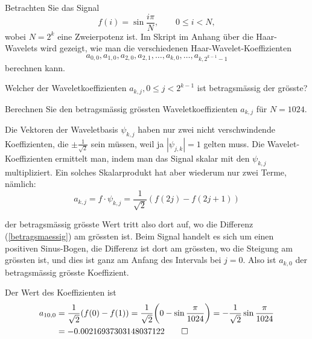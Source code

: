 Betrachten Sie das Signal
\[
f(i)=\sin\frac{i\pi}{N}, \qquad 0\le i<N,
\]
wobei $N=2^k$ eine Zweierpotenz ist.
Im Skript im Anhang über die Haar-Wavelets wird gezeigt,
wie man die verschiedenen Haar-Wavelet-Koeffizienten
\[
a_{0,0},a_{1,0}, a_{2,0},a_{2,1},\dots ,a_{k,0},\dots, a_{k,2^{k-1}-1}
\]
berechnen kann.
\begin{teilaufgaben}
\item
Welcher der Waveletkoeffizienten $a_{k,j}, 0\le j<2^{k-1}$ ist betragsmässig
der grösste?
\item
Berechnen Sie den betragsmässig grössten Waveletkoeffizienten $a_{k,j}$
für $N=1024$.
\end{teilaufgaben}


\begin{loesung}
Die Vektoren der Waveletbasis $\psi_{k,j}$ haben nur zwei nicht verschwindende
Koeffizienten, die $\pm\frac1{\sqrt{2}}$ sein müssen, weil ja $|\psi_{j,k}|=1$
gelten muss. Die Wavelet-Koeffizienten ermittelt man, indem man das Signal
skalar mit den $\psi_{k,j}$ multipliziert. Ein solches Skalarprodukt hat
aber wiederum nur zwei Terme, nämlich:
\begin{equation}
a_{k,j}=f\cdot \psi_{k,j} = \frac1{\sqrt{2}}(f(2j)-f(2j+1))
\label{betragsmaessig}
\end{equation}
\begin{teilaufgaben}
\item der betragsmässig grösste Wert tritt also dort auf, wo die Differenz
(\ref{betragsmaessig}) am grössten ist. Beim Signal handelt es sich um
einen positiven Sinus-Bogen, die Differenz ist dort am grössten, wo die
Steigung am grössten ist, und dies ist ganz am Anfang des Intervals bei
$j=0$. Also ist $a_{k,0}$ der betragsmässig grösste Koeffizient.
\item Der Wert des Koeffizienten ist
\begin{align*}
a_{10,0}&=\frac1{\sqrt{2}}(f(0)-f(1))=\frac1{\sqrt{2}}\biggl(0-\sin\frac{\pi}{1024}\biggr)
=-\frac1{\sqrt{2}}\sin\frac{\pi}{1024}\\
&=-0.00216937303148037122
\qedhere
\end{align*}
\end{teilaufgaben}
\end{loesung}

